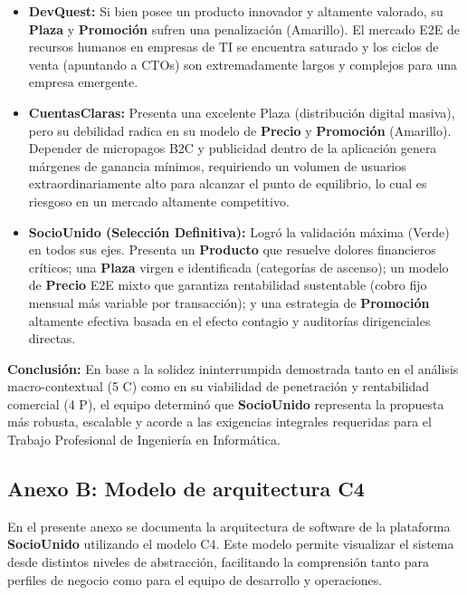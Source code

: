 \begin{itemize}
    \item \textbf{DevQuest:} Si bien posee un producto innovador y altamente valorado, su \textbf{Plaza} y \textbf{Promoción} sufren una penalización (\colorbox{yellow!50}{Amarillo}). El mercado E2E de recursos humanos en empresas de TI se encuentra saturado y los ciclos de venta (apuntando a CTOs) son extremadamente largos y complejos para una empresa emergente.
    \item \textbf{CuentasClaras:} Presenta una excelente Plaza (distribución digital masiva), pero su debilidad radica en su modelo de \textbf{Precio} y \textbf{Promoción} (\colorbox{yellow!50}{Amarillo}). Depender de micropagos B2C y publicidad dentro de la aplicación genera márgenes de ganancia mínimos, requiriendo un volumen de usuarios extraordinariamente alto para alcanzar el punto de equilibrio, lo cual es riesgoso en un mercado altamente competitivo.
    \item \textbf{SocioUnido (Selección Definitiva):} Logró la validación máxima (\colorbox{green!50}{Verde}) en todos sus ejes. Presenta un \textbf{Producto} que resuelve dolores financieros críticos; una \textbf{Plaza} virgen e identificada (categorías de ascenso); un modelo de \textbf{Precio} E2E mixto que garantiza rentabilidad sustentable (cobro fijo mensual más variable por transacción); y una estrategia de \textbf{Promoción} altamente efectiva basada en el efecto contagio y auditorías dirigenciales directas.
\end{itemize}

\textbf{Conclusión:} En base a la solidez ininterrumpida demostrada tanto en el análisis macro-contextual (5 C) como en su viabilidad de penetración y rentabilidad comercial (4 P), el equipo determinó que \textbf{SocioUnido} representa la propuesta más robusta, escalable y acorde a las exigencias integrales requeridas para el Trabajo Profesional de Ingeniería en Informática.

\newpage

\subsection{Anexo B: Modelo de arquitectura C4}

En el presente anexo se documenta la arquitectura de software de la plataforma \textbf{SocioUnido} utilizando el modelo C4. Este modelo permite visualizar el sistema desde distintos niveles de abstracción, facilitando la comprensión tanto para perfiles de negocio como para el equipo de desarrollo y operaciones.


